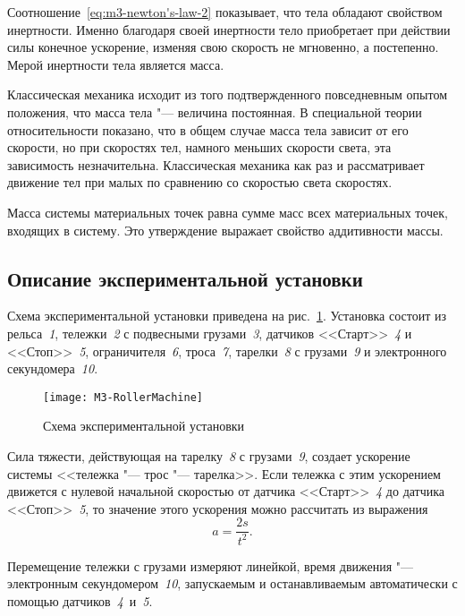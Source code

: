 \documentclass[a4paper, 12pt]{extarticle}
\begin{document}
Соотношение~\eqref{eq:m3-newton's-law-2} показывает, что тела обладают свойством инертности. Именно благодаря своей инертности тело приобретает при действии силы конечное ускорение, изменяя свою скорость не мгновенно, а постепенно. Мерой инертности тела является масса.

Классическая механика исходит из того подтвержденного повседневным опытом положения, что масса тела "--- величина постоянная. В специальной теории относительности показано, что в общем случае масса тела зависит от его скорости, но при скоростях тел, намного меньших скорости света, эта зависимость незначительна. Классическая механика как раз и рассматривает движение тел при малых по сравнению со скоростью света скоростях.

Масса системы материальных точек равна сумме масс всех материальных точек, входящих в систему. Это утверждение выражает свойство аддитивности массы.

\subsection{Описание экспериментальной установки}
Схема экспериментальной установки приведена на рис.~\ref{fig:m3-equipment}. Установка состоит из рельса~\emph{1}, тележки~\emph{2} с подвесными грузами~\emph{3}, датчиков <<Старт>>~\emph{4} и <<Стоп>>~\emph{5}, ограничителя~\emph{6}, троса~\emph{7}, тарелки~\emph{8} с грузами~\emph{9} и электронного секундомера~\emph{10}.

\begin{figure}[h]
\begin{center}
\texttt{[image: M3-RollerMachine]}
\end{center}
\caption{Схема экспериментальной установки \label{fig:m3-equipment}}
\end{figure}

Сила тяжести, действующая на тарелку~\emph{8} с грузами~\emph{9}, создает ускорение системы <<тележка "--- трос "--- тарелка>>. Если тележка с этим ускорением движется с нулевой начальной скоростью от датчика <<Старт>>~\emph{4} до датчика <<Стоп>>~\emph{5}, то значение этого ускорения можно рассчитать из выражения %
\begin{equation}
\label{eq:m3-acceleration}
a = \frac{2s}{t^2}.
\end{equation}

Перемещение тележки с грузами измеряют линейкой, время движения "--- электронным секундомером~\emph{10}, запускаемым и останавливаемым автоматически с помощью датчиков~\emph{4}~и~\emph{5}. %
\end{document}
